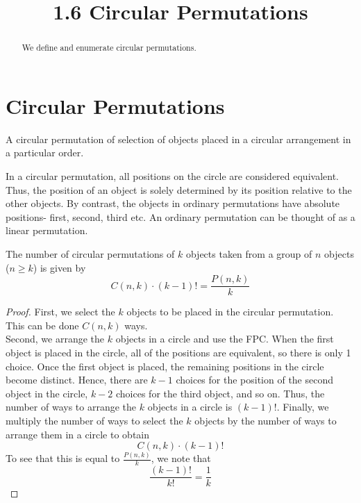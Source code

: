\documentclass[handout]{ximera}
\title{1.6 Circular Permutations}
\begin{document}
\begin{abstract}
We define and enumerate circular permutations.
\end{abstract}

\maketitle

\section{Circular Permutations}



\begin{definition}
A circular permutation of selection of objects placed in a circular 
arrangement in a particular order.
\end{definition}


In a circular permutation, all positions on the circle are considered equivalent. 
Thus, the position of an object
is solely determined by its position relative to the other objects. 
By contrast, the objects in ordinary permutations have 
absolute positions- first, second, third etc.  An ordinary permutation 
can be thought of as a linear permutation.\\

\begin{proposition}
The number of circular permutations of $k$ objects taken from a 
group of $n$ objects ($n \geq k$) is given by
\[
C(n,k)\cdot (k-1)! = \frac{P(n,k)}{k}
\]
\end{proposition}

\begin{proof}
First, we select the $k$ objects to be placed in the circular permutation.  
This can be done $C(n,k)$ ways.\\
Second, we arrange the $k$ objects in a circle and use the FPC. 
When the first object is placed in the circle, all of the positions are 
equivalent, so there is only 1 choice. Once the first object is placed, 
the remaining positions in the circle become distinct.  
Hence, there are $k-1$ choices for the position of the second object in the 
circle, $k-2$ choices for the third object, and so on. 
Thus, the number of ways to arrange the $k$ objects in a circle  is $(k-1)!$.
Finally, we multiply the number of ways to select the $k$ objects by the 
number of ways to arrange them in a circle to obtain
\[
C(n,k)\cdot (k-1)!
\]
To see that this is equal to $\frac{P(n,k)}{k}$, we note that 
\[
\frac{(k-1)!}{k!} = \frac{1}{k}
\]
\end{proof}
\end{document}

